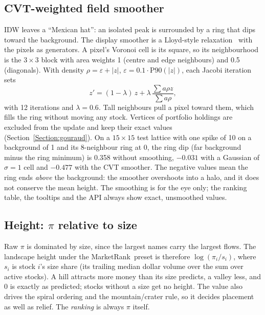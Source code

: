 \documentclass[preprint,3p,twocolumn]{elsarticle}
\newcommand{\MR}{MarketRank}
\begin{document}
\subsection{CVT-weighted field smoother}
IDW leaves a ``Mexican hat'': an isolated peak is surrounded by a ring that dips toward the background. The display smoother is a Lloyd-style relaxation~\cite{lloyd,cvt} with the pixels as generators. A pixel's Voronoi cell is its square, so its neighbourhood is the $3\times3$ block with area weights 1 (centre and edge neighbours) and 0.5 (diagonals). With density $\rho=\varepsilon+|z|$, $\varepsilon=0.1\cdot\mathrm{P90}(|z|)$, each Jacobi iteration sets
\begin{equation}
z'=(1-\lambda)\,z+\lambda\,\frac{\sum a\rho z}{\sum a\rho},
\end{equation}
with 12 iterations and $\lambda=0.6$. Tall neighbours pull a pixel toward them, which fills the ring without moving any stock. Vertices of portfolio holdings are excluded from the update and keep their exact values (Section~\ref{Section:gouraud}). On a $15\times15$ test lattice with one spike of 10 on a background of 1 and its 8-neighbour ring at 0, the ring dip (far background minus the ring minimum) is 0.358 without smoothing, $-0.031$ with a Gaussian of $\sigma=1$ cell and $-0.477$ with the CVT smoother. The negative values mean the ring ends \emph{above} the background: the smoother overshoots into a halo, and it does not conserve the mean height. The smoothing is for the eye only; the ranking table, the tooltips and the API always show exact, unsmoothed values.

\subsection{Height: \texorpdfstring{$\pi$}{pi} relative to size}
Raw $\pi$ is dominated by size, since the largest names carry the largest flows. The landscape height under the \MR\ preset is therefore $\log(\pi_i/s_i)$, where $s_i$ is stock $i$'s size share (its trailing median dollar volume over the sum over active stocks). A hill attracts more money than its size predicts, a valley less, and 0 is exactly as predicted; stocks without a size get no height. The value also drives the spiral ordering and the mountain/crater rule, so it decides placement as well as relief. The \emph{ranking} is always $\pi$ itself.
\end{document}
